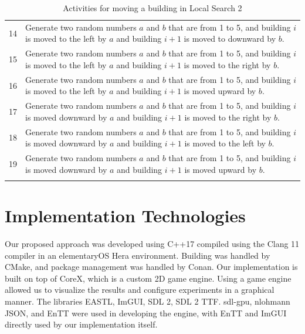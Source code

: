 \begin{longtable}{| c | p{120mm} |}
	14 & Generate two random numbers $a$ and $b$ that are from 1 to 5, and building $i$ is moved to the left by $a$ and building $i + 1$ is moved to downward by $b$. \\
	15 & Generate two random numbers $a$ and $b$ that are from 1 to 5, and building $i$ is moved to the left by $a$ and building $i + 1$ is moved to the right by $b$. \\
	16 & Generate two random numbers $a$ and $b$ that are from 1 to 5, and building $i$ is moved to the left by $a$ and building $i + 1$ is moved upward by $b$. \\
	17 & Generate two random numbers $a$ and $b$ that are from 1 to 5, and building $i$ is moved downward by $a$ and building $i + 1$ is moved to the right by $b$. \\
	18 & Generate two random numbers $a$ and $b$ that are from 1 to 5, and building $i$ is moved downward by $a$ and building $i + 1$ is moved to the left by $b$. \\
	19 & Generate two random numbers $a$ and $b$ that are from 1 to 5, and building $i$ is moved downward by $a$ and building $i + 1$ is moved upward by $b$. \\
	\hline
	\caption{Activities for moving a building in Local Search 2}
	\label{local-search-2-activities}
\end{longtable}

\section{Implementation Technologies}
Our proposed approach was developed using C++17 compiled using the Clang 11 compiler in an elementaryOS Hera environment. Building was handled by CMake, and package management was handled by Conan. Our implementation is built on top of CoreX, which is a custom 2D game engine. Using a game engine allowed us to visualize the results and configure experiments in a graphical manner. The libraries EASTL, ImGUI, SDL 2, SDL 2 TTF. sdl-gpu, nlohmann JSON, and EnTT were used in developing the engine, with EnTT and ImGUI directly used by our implementation itself.